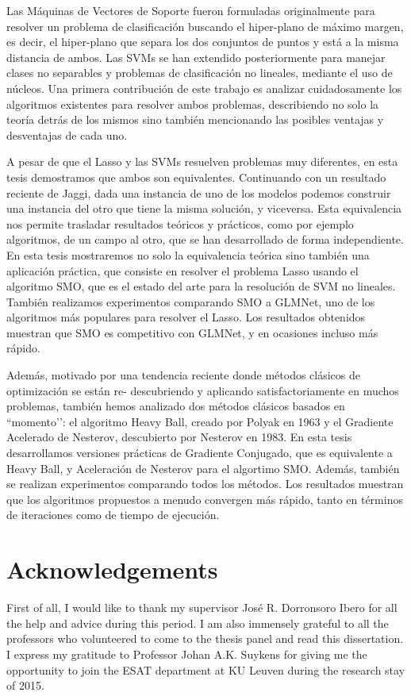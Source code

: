 \documentclass[a4paper, 11pt, openright, twoside]{reportPhD}
\numberwithin{equation}{section}
\numberwithin{figure}{chapter}
\numberwithin{table}{chapter}
\begin{document}
Las Máquinas de Vectores de Soporte fueron formuladas originalmente para resolver un problema de
clasificación buscando el hiper-plano de máximo margen, es decir, el hiper-plano que separa los dos
conjuntos de puntos y está a la misma distancia de ambos. Las SVMs se han extendido posteriormente
para manejar clases no separables y problemas de clasificación no lineales, mediante el uso de núcleos. Una primera contribución de este trabajo es analizar cuidadosamente los algoritmos existentes para resolver ambos problemas, describiendo no solo la teoría detrás de los mismos sino también mencionando las posibles ventajas y desventajas de cada uno.

A pesar de que el Lasso y las SVMs resuelven problemas muy diferentes, en esta tesis demostramos que
ambos son equivalentes. Continuando con un resultado reciente de Jaggi, dada una instancia de uno de
los modelos podemos construir una instancia del otro que tiene la misma solución, y viceversa. Esta
equivalencia nos permite trasladar resultados teóricos y prácticos, como por ejemplo algoritmos, de un campo al otro, que se han desarrollado de forma independiente. En esta tesis mostraremos no solo la equivalencia teórica sino también una aplicación práctica, que consiste en resolver el problema Lasso usando el algoritmo SMO, que es el estado del arte para la resolución de SVM no lineales. También realizamos experimentos comparando SMO a GLMNet, uno de los algoritmos más populares para
resolver el Lasso. Los resultados obtenidos muestran que SMO es competitivo con GLMNet, y en
ocasiones incluso más rápido.

Además, motivado por una tendencia reciente donde métodos clásicos de optimización se están re-
descubriendo y aplicando satisfactoriamente en muchos problemas, también hemos analizado dos
métodos clásicos basados en ``momento’’: el algoritmo Heavy Ball, creado por Polyak en 1963 y el
Gradiente Acelerado de Nesterov, descubierto por Nesterov en 1983. En esta tesis desarrollamos
versiones prácticas de Gradiente Conjugado, que es equivalente a Heavy Ball, y Aceleración de Nesterov para el algortimo SMO. Además, también se realizan experimentos comparando todos los métodos. Los resultados muestran que los algoritmos propuestos a menudo convergen más rápido, tanto en términos de iteraciones como de tiempo de ejecución.


\chapter*{Acknowledgements}
First of all, I would like to thank my supervisor José R. Dorronsoro Ibero for all the help and advice during this period. I am also immensely grateful to all the professors who volunteered to come to the
thesis panel and read this dissertation. I express my gratitude to Professor Johan A.K. Suykens for giving me the opportunity to join the ESAT department at KU Leuven during the research stay of 2015.
\end{document}
